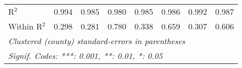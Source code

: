\begin{table}[htbp]
\begin{tabular}{lccccccc}
      R$^2$                                                   & 0.994         & 0.985        & 0.980          & 0.985         & 0.986          & 0.992          & 0.987\\  
      Within R$^2$                                            & 0.298         & 0.281        & 0.780          & 0.338         & 0.659          & 0.307          & 0.606\\  
      \midrule \midrule
      \multicolumn{8}{l}{\emph{Clustered (county) standard-errors in parentheses}}\\
      \multicolumn{8}{l}{\emph{Signif. Codes: ***: 0.001, **: 0.01, *: 0.05}}\\
   \end{tabular}
\end{table}




